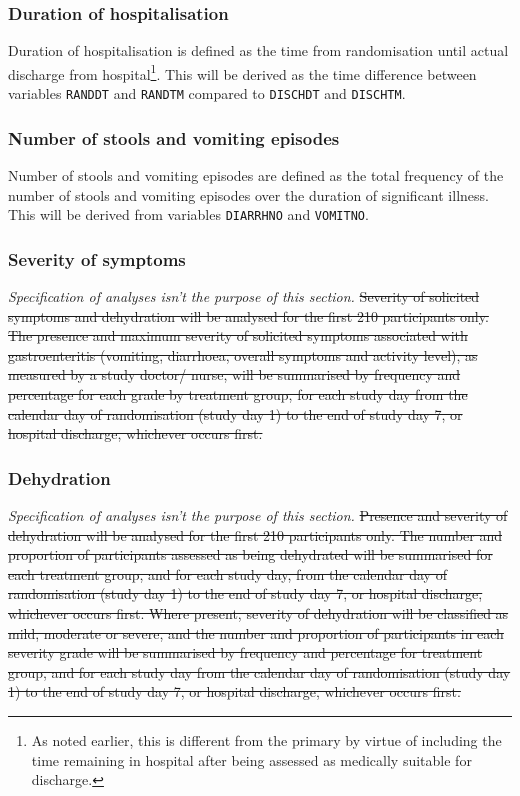 \documentclass[a4paper]{article}
\begin{document}
\subsubsection{Duration of hospitalisation}

Duration of hospitalisation is defined as the time from randomisation until actual discharge from hospital\footnote{As noted earlier, this is different from the primary by virtue of including the time remaining in hospital after being assessed as medically suitable for discharge.}.
This will be derived as the time difference between variables \texttt{RANDDT} and \texttt{RANDTM} compared to \texttt{DISCHDT} and \texttt{DISCHTM}.

\subsubsection{Number of stools and vomiting episodes}

Number of stools and vomiting episodes are defined as the total frequency of the number of stools and vomiting episodes over the duration of significant illness.
This will be derived from variables \texttt{DIARRHNO} and \texttt{VOMITNO}.

\subsubsection{Severity of symptoms} 

\textit{Specification of analyses isn't the purpose of this section.}
\st{Severity of solicited symptoms and dehydration will be analysed for the first 210 participants only.
The presence and maximum severity of solicited symptoms associated with gastroenteritis (vomiting, diarrhoea, overall symptoms and activity level), as measured by a study doctor/ nurse, will be summarised by frequency and percentage for each grade by treatment group, for each study day from the calendar day of randomisation (study day 1) to the end of study day 7, or hospital discharge, whichever occurs first.}

\subsubsection{Dehydration} 

\textit{Specification of analyses isn't the purpose of this section.}
\st{Presence and severity of dehydration will be analysed for the first 210 participants only.
The number and proportion of participants assessed as being dehydrated will be summarised for each treatment group, and for each study day, from the calendar day of randomisation (study day 1) to the end of study day 7, or hospital discharge, whichever occurs first.
Where present, severity of dehydration will be classified as mild, moderate or severe, and the number and proportion of participants in each severity grade will be summarised by frequency and percentage for treatment group, and for each study day from the calendar day of randomisation (study day 1) to the end of study day 7, or hospital discharge, whichever occurs first.}
\end{document}
